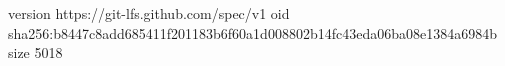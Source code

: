 version https://git-lfs.github.com/spec/v1
oid sha256:b8447c8add685411f201183b6f60a1d008802b14fc43eda06ba08e1384a6984b
size 5018
